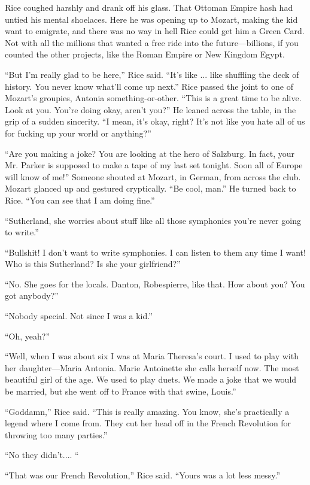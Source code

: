 Rice coughed harshly and drank off his glass. That Ottoman Empire hash had untied his mental shoelaces. Here he was opening up to Mozart, making the kid want to emigrate, and there was no way in hell Rice could get him a Green Card. Not with all the millions that wanted a free ride into the future—billions, if you counted the other projects, like the Roman Empire or New Kingdom Egypt.

“But I’m really glad to be here,” Rice said. “It’s like ... like shuffling the deck of history. You never know what’ll come up next.” Rice passed the joint to one of Mozart’s groupies, Antonia something-or-other. “This is a great time to be alive. Look at you. You’re doing okay, aren’t you?” He leaned across the table, in the grip of a sudden sincerity. “I mean, it’s okay, right? It’s not like you hate all of us for fucking up your world or anything?”

“Are you making a joke? You are looking at the hero of Salzburg. In fact, your Mr. Parker is supposed to make a tape of my last set tonight. Soon all of Europe will know of me!” Someone shouted at Mozart, in German, from across the club. Mozart glanced up and gestured cryptically. “Be cool, man.” He turned back to Rice. “You can see that I am doing fine.”

“Sutherland, she worries about stuff like all those symphonies you’re never going to write.”

“Bullshit! I don’t want to write symphonies. I can listen to them any time I want! Who is this Sutherland? Is she your girlfriend?”

“No. She goes for the locals. Danton, Robespierre, like that. How about you? You got anybody?”

“Nobody special. Not since I was a kid.”

“Oh, yeah?”

“Well, when I was about six I was at Maria Theresa’s court. I used to play with her daughter—Maria Antonia. Marie Antoinette she calls herself now. The most beautiful girl of the age. We used to play duets. We made a joke that we would be married, but she went off to France with that swine, Louis.”

“Goddamn,” Rice said. “This is really amazing. You know, she’s practically a legend where I come from. They cut her head off in the French Revolution for throwing too many parties.”

“No they didn’t.... “

“That was our French Revolution,” Rice said. “Yours was a lot less messy.”

